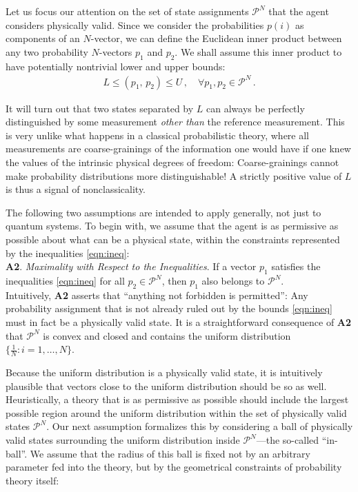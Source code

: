 \documentclass[%
 reprint,superscriptaddress,
 amsmath,amssymb,
 aps,twocolumn,pra
]{revtex4-1}
\newcommand{\eqn}[1]{\begin{eqnarray} #1 \end{eqnarray}}
\newcommand{\tit}[1]{\textit{#1}}
\begin{document}
Let us focus our attention on the set of state assignments $\mathcal{P}^N$ that the agent considers physically valid. Since we consider the probabilities $p(i)$ as components of an $N$-vector, we can define the Euclidean inner product between any two probability $N$-vectors $p_1$ and $p_2$.  We shall assume this inner product to have potentially nontrivial lower and upper bounds:
\eqn{ \label{eqn:ineq}
L \leq (p_1, \, p_2) \leq U \, , \quad \forall p_1,p_2 \in \mathcal{P}^N \, .
}

It will turn out that two states separated by $L$ can always be perfectly distinguished by some measurement \tit{other than} the reference measurement. This is very unlike what happens in a classical probabilistic theory, where all measurements are coarse-grainings of the information one would have if one knew the values of the intrinsic physical degrees of freedom:  Coarse-grainings cannot make probability distributions more distinguishable! A strictly positive value of $L$ is thus a signal of nonclassicality.

The following two assumptions are intended to apply generally, not just to quantum systems. To begin with, we assume that the agent is as permissive as possible about what can be a physical state, within the constraints represented by the inequalities \eqref{eqn:ineq}:\\

{\bf A2}. \tit{Maximality with Respect to the Inequalities}. If a vector $p_1$ satisfies the inequalities \eqref{eqn:ineq} for all $p_2 \in \mathcal{P}^N$, then $p_1 $ also belongs to $\mathcal{P}^N$.\\

Intuitively, {\bf A2} asserts that ``anything not forbidden is permitted'': Any probability assignment that is not already ruled out by the bounds \eqref{eqn:ineq} must in fact be a physically valid state. It is a straightforward consequence of {\bf A2} that $\mathcal{P}^N$ is convex and closed and contains the uniform distribution $\{\frac{1}{N} : i=1,\dots,N\}$.

Because the uniform distribution is a physically valid state, it is intuitively plausible that vectors close to the uniform distribution should be so as well. Heuristically, a theory that is as permissive as possible should include the largest possible region around the uniform distribution within the set of physically valid states $\mathcal{P}^N$. Our next assumption formalizes this by considering a ball of physically valid states surrounding the uniform distribution inside $\mathcal{P}^N$---the so-called ``in-ball''. We assume that the radius of this ball is fixed not by an arbitrary parameter fed into the theory, but by the geometrical constraints of probability theory itself:\\
\end{document}
